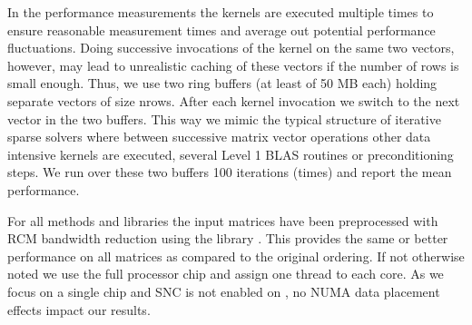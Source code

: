 In the performance measurements the kernels are executed multiple times \inorder to ensure reasonable measurement times and average out potential performance fluctuations. Doing successive invocations of the kernel on the same two vectors, however, may lead to unrealistic caching of these vectors if the number of rows is small enough. Thus, we use two ring buffers (at least of 50 MB each) holding separate vectors of size \acrshort{nrows}. After each kernel invocation we switch to the next vector in the two buffers. This way we mimic the typical structure of iterative sparse solvers where between successive matrix vector operations other data intensive kernels are executed, \eg several Level 1 BLAS routines or preconditioning steps. We run over these two buffers 100 iterations (times) and report the mean performance.

For all methods and libraries the input matrices have been preprocessed with \acrshort{RCM} bandwidth reduction using the \SPMP library \cite{SpMP}. This provides the same or better performance on all matrices as compared to the original ordering. If not otherwise noted we use the full processor chip and assign one thread to each core. As we focus on a single chip and SNC is not enabled on \SKX, no NUMA data placement effects impact our results.  



